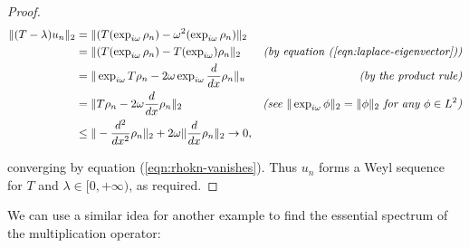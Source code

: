 \documentclass[../main.tex]{subfiles}
\begin{document}
\begin{proof}
\begin{align*}
\|(T - \lambda)u_n\|_2 & = \|(T(\exp_{i \omega} \rho_n) - \omega^2(\exp_{i \omega} \rho_n)\|_2 & \\
& = \|(T(\exp_{i \omega} \rho_n) - T(\exp_{i \omega}) \rho_n\|_2 
  & \text{\emph{(by equation (\ref{eqn:laplace-eigenvector}))}} \\
& =\|\exp_{i \omega} T\rho_n - 2 \omega \exp_{i \omega} \frac{d}{dx}\rho_n\|_u 
  & \text{\emph{(by the product rule)}} \\
& = \|T\rho_n - 2 \omega \frac{d}{dx}\rho_n\|_2 
  & \text{\emph{(see $\|\exp_{i \omega} \phi\|_2 = \|\phi\|_2$ for any $\phi \in L^2$)}} \\
& \leq  \|-\frac{d^2}{dx^2}\rho_n\|_2 + 2\omega\|\frac{d}{dx}\rho_n\|_2 \rightarrow 0, &
\end{align*}

converging by equation (\ref{eqn:rhokn-vanishes}).
Thus $u_n$ forms a Weyl sequence for $T$ and $\lambda \in [0, +\infty)$, as
required. 
\end{proof}

We can use a similar idea for another example to find the essential spectrum of
the multiplication operator:
\end{document}
